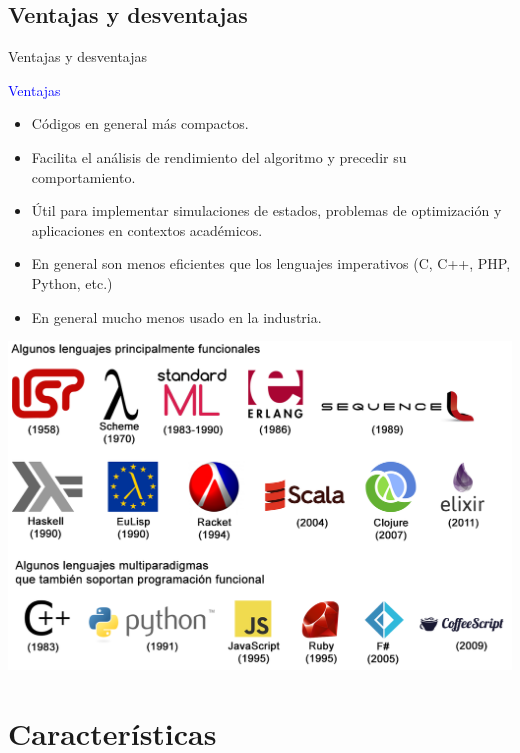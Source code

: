 \documentclass{beamer} %
\newcommand{\blue}[1]{\textcolor{blue}{#1}}
\begin{document}
\subsection{Ventajas y desventajas}

\begin{frame}{Ventajas y desventajas}

  \blue{Ventajas}
  \begin{itemize}
    \item<2-> Códigos en general más compactos.
    \item<3-> Facilita el análisis de rendimiento del algoritmo y precedir su comportamiento.
    \item<4-> Útil para implementar simulaciones de estados, problemas de optimización y aplicaciones en contextos académicos.
  \end{itemize}
  \uncover<5->{\blue{Desventajas}}
  \begin{itemize}
      \item<6-> En general son menos eficientes que los lenguajes imperativos (C, C++, PHP, Python, etc.)
      \item<7-> En general mucho menos usado en la industria.
  \end{itemize}
\end{frame}

\begin{frame}{}
  \begin{center}
    \includegraphics[width=\textwidth]{./image/cap4/lengfuncionales.png}
  \end{center}
\end{frame}

\section{Características}
\end{document}
